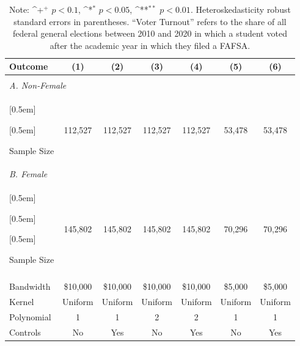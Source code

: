 \documentclass[12pt,letterpaper,oneside]{book}
\newcommand{\basepath}{g:/My Drive/Grad School}
\newcommand{\basepath}{basepath}
\begin{document}
    \begin{table}[h!]\centering
    \def\sym#1{\ifmmode^{#1}\else\(^{#1}\)\fi}
    \caption{Impacts of 2017-2019 Cal Grants on Political Participation by Gender\label{tab:gender_results1}}
    \begin{tabular}{l*{6}{c}}
        \hline\hline
        Outcome&\multicolumn{1}{c}{(1)}&\multicolumn{1}{c}{(2)}&\multicolumn{1}{c}{(3)}&\multicolumn{1}{c}{(4)}&\multicolumn{1}{c}{(5)}&\multicolumn{1}{c}{(6)}\\
        \hline
        &&&&&&\\
        \multicolumn{7}{l}{\textit{A. Non-Female}} \\ [0.5em]
         [0.5em]

         [0.5em]

         [0.5em]

            Sample Size      &    112,527    &     112,527   &      112,527    &     112,527   &   53,478    &   53,478        \\[0.5em]

        \multicolumn{7}{l}{\textit{B. Female}} \\ [0.5em]

         [0.5em]

         [0.5em]

         [0.5em]

            Sample Size      &  145,802    &   145,802     &     145,802     &   145,802    &   70,296    &   70,296        \\

        &&&&&&\\

        \hline
        Bandwidth & \$10,000       &   \$10,000        &   \$10,000        &   \$10,000       &   \$5,000        &   \$5,000        \\
        Kernel&   Uniform      &   Uniform        &   Uniform        &   Uniform       &   Uniform       &   Uniform       \\
        Polynomial&   1       &   1        &   2        &   2       &   1       &   1       \\
        Controls&   No       &   Yes        &   No        &   Yes        &   No        &   Yes        \\

        \hline
    \end{tabular}
    \caption*{\footnotesize Note: \sym{+} \(p<0.1\), \sym{*} \(p<0.05\), \sym{**} \(p<0.01\). Heteroskedasticity robust standard errors in parentheses. ``Voter Turnout'' refers to the share of all federal general elections between 2010 and 2020 in which a student voted after the academic year in which they filed a FAFSA.}
\end{table}
\end{document}
